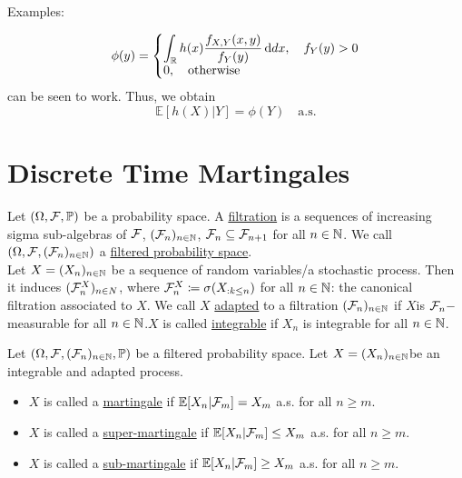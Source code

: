 \documentclass{article}
\begin{document}
\begin{examplesblock}{Examples: }
\begin{enumerate}
\[
\phi(y) = \left\lbrace
\begin{array}{@{}l@{}}
    \displaystyle\int_{\R} h(x)\frac{f_{X,Y}(x,y)}{f_{Y}(y)} \diff dx, \quad f_{Y}(y)>0   \\
    0, \quad \text{otherwise}
\end{array}\right.
\]
can be seen to work. Thus, we obtain 
\[
	\mathbb{E}[h(X)|Y] = \phi(Y) \quad \text{a.s.}
\]
	
\end{enumerate}
\end{examplesblock}


\section{Discrete Time Martingales}

\begin{boxdef}[Filtration]\label{def: filtration}
	Let $ (\Omega, \mathcal{F}, \mathbb{P})$ be a probability space. A \underline{filtration} is a sequences of increasing sigma sub-algebras of $ \mathcal{F}$, $ (\mathcal{F}_{n})_{n\in \mathbb{N}}$, $ \mathcal{F}_{n}\subseteq \mathcal{F}_{n+1}$ for all $ n\in \mathbb{N}$. We call $ (\Omega, \mathcal{F}, (\mathcal{F}_{n})_{n\in\mathbb{N}})$ a \underline{filtered probability space}.\\ 

	Let $X =  (X_{n})_{n\in \mathbb{N}}$ be a sequence of random variables/a stochastic process. Then it induces $ (\mathcal{F}^{X}_{n})_{n\in N}$, where $ \mathcal{F}^{X}_{n}\coloneqq \sigma(X_{:k\leq n})$ for all $ n\in \mathbb{N}$: the canonical filtration associated to $ X$. We call $ X$ \underline{adapted} to a filtration $ (\mathcal{F}_{n})_{n\in \mathbb{N}}$ if $ X$is $ \mathcal{F}_{n}-$measurable for all $ n\in \mathbb{N}$.$ X$ is called \underline{integrable} if $ X_{n}$ is integrable for all $ n\in \mathbb{N}$.
\end{boxdef}

\begin{boxdef}\label{def: martingale}
Let $ (\Omega, \mathcal{F}, (\mathcal{F}_{n})_{n\in\mathbb{N}}, \mathbb{P})$ be a filtered probability space. Let $ X = (X_{n})_{n\in \mathbb{N}}$be an integrable and adapted process. 
\begin{itemize}
	\item $ X$ is called a \underline{martingale} if $ \mathbb{E}[X_{n}| \mathcal{F}_{m}]=X_{m}$ a.s. for all $ n\geq m$.
	\item $ X$ is called a \underline{super-martingale} if $ \mathbb{E}[X_{n}| \mathcal{F}_{m}]\leq X_{m}$ a.s. for all $ n\geq m$.
        \item $ X$ is called a \underline{sub-martingale} if $ \mathbb{E}[X_{n}| \mathcal{F}_{m}]\geq X_{m}$ a.s. for all $ n\geq m$.
\end{itemize}

\end{boxdef}
\end{document}
